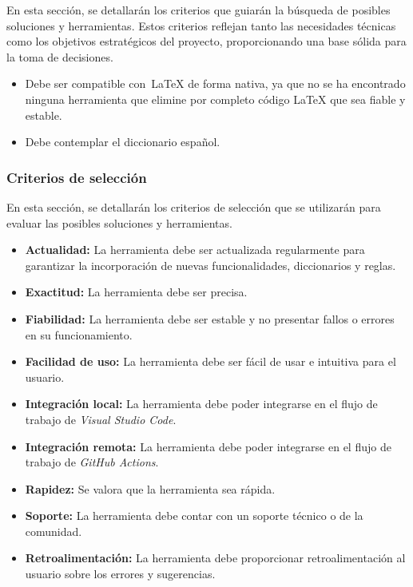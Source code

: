 En esta sección, se detallarán los criterios que guiarán la búsqueda de posibles soluciones y herramientas. Estos criterios reflejan tanto las necesidades técnicas como los objetivos estratégicos del proyecto, proporcionando una base sólida para la toma de decisiones. 

\begin{itemize}
    \item Debe ser compatible con~\LaTeX{} de forma nativa, ya que no se ha encontrado ninguna herramienta que elimine por completo código \LaTeX{} que sea fiable y estable.
    \item Debe contemplar el diccionario español.
\end{itemize}

\subsubsection{Criterios de selección}

En esta sección, se detallarán los criterios de selección que se utilizarán para evaluar las posibles soluciones y herramientas.

\begin{itemize}
    \item \textbf{Actualidad:} La herramienta debe ser actualizada regularmente para garantizar la incorporación de nuevas funcionalidades, diccionarios y reglas.
    \item \textbf{Exactitud:} La herramienta debe ser precisa.
    \item \textbf{Fiabilidad:} La herramienta debe ser estable y no presentar fallos o errores en su funcionamiento.
    \item \textbf{Facilidad de uso:} La herramienta debe ser fácil de usar e intuitiva para el usuario.
    \item \textbf{Integración local:} La herramienta debe poder integrarse en el flujo de trabajo de \textit{Visual Studio Code}.
    \item \textbf{Integración remota:} La herramienta debe poder integrarse en el flujo de trabajo de \textit{GitHub Actions}.
    \item \textbf{Rapidez:} Se valora que la herramienta sea rápida.
    \item \textbf{Soporte:} La herramienta debe contar con un soporte técnico o de la comunidad.
    \item \textbf{Retroalimentación:} La herramienta debe proporcionar retroalimentación al usuario sobre los errores y sugerencias.
\end{itemize}

